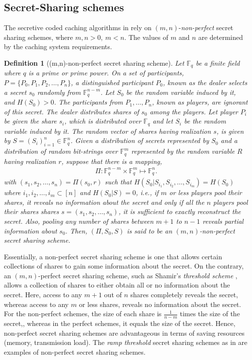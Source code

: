 \documentclass[conference]{IEEEtran}
\newtheorem{defn}{Definition}
\begin{document}
\subsection{Secret-Sharing schemes}
\label{sec2B}
The secretive coded caching algorithms in \cite{SecretiveCc, PrivateCc,D2DSecureCc,
	SecCombi,SecretiveCollud,ImprovedSecretiveCc} rely on $(m,n)$-\emph{non-perfect} secret sharing schemes, where $m,n>0, \ m<n$. The values of $m$ and $n$ are determined by the caching system requirements. 
\begin{defn}[(m,n)-non-perfect secret sharing scheme\cite{Ogata}]
	 Let $\mathbb{F}_q$ be a finite field where $q$ is a prime or prime power. On a set of participants, $P =\{P_0,P_1,P_2,\ldots,P_n\}$, a distinguished participant $P_0$, known as the \emph{dealer} selects a \emph{secret} $s_0$ randomly from $\mathbb{F}_q^{n-m}$. Let $S_0$ be the random variable induced by it, and $H(S_0)>0$. The participants from $P_1,\ldots, P_n$, known as \emph{players}, are ignorant of this secret. The dealer distributes \emph{shares} of $s_0$ among the players. Let player $P_i$ be given the share $s_i$, which is distributed over $\mathbb{F}_q$ and let $S_i$ be the random variable induced by it. The random vector of shares having realization $s$, is given by $S=(S_i)_{i=1}^{n}\in \mathbb{F}_q^n$. Given a distribution of secrets represented by $S_0$ and a distribution of random bit-strings over $\mathbb{F}_q^m$ represented by the random variable $R$ having realization $r$, suppose that there is a mapping,
	\begin{align*}
	\Pi:\mathbb{F}_q^{n-m}\times\mathbb{F}_q^m\mapsto \mathbb{F}_q^n.
	\end{align*} 
	with $(s_1,s_2,\ldots, s_n)=\Pi(s_0,r)$ such that $H(S_0|S_{i_1},S_{i_2},\ldots,S_{i_m})=H(S_0)$ where $i_1,i_2,\ldots,i_m\subset[n]$ and $H(S_0|S)=0$, i.e., if $m$ or less players pool their shares, it reveals no information about the secret and only if all the $n$ players pool their shares shares $s=(s_1,s_2,\ldots,s_n)$, it is sufficient to exactly reconstruct the secret. Also, pooling any number of shares between $m+1$ to $n-1$ reveals partial information about $s_0$. Then, $(\Pi,S_0,S)$ is said to be an $(m,n)$-non-perfect secret sharing scheme. 
\end{defn}
\par Essentially, a non-perfect secret sharing scheme is one that allows certain collections of shares to gain some information about the secret. On the contrary, an $(m,n)$-perfect secret sharing scheme, such as Shamir's \emph{threshold scheme} \cite{Shamir},\cite{SecureMPC} allows a collection of shares to either obtain all or no information about the secret. Here, access to any $m+1$ out of $n$ shares completely reveals the secret, whereas access to any $m$ or less shares, reveals no information about the secret. For the non-perfect schemes, the size of each share is $\frac{1}{n-m}$ times the size of the secret\cite{Farras},\cite{Ogata}, whereas in the perfect schemes, it equals the size of the secret. Hence, non-perfect secret sharing schemes are advantageous in terms of saving resources (memory, transmission load). The \emph{ramp threshold} secret sharing schemes as in \cite{BlakelyMeadows,Yamamoto} are examples of non-perfect secret sharing schemes. 
\end{document}
